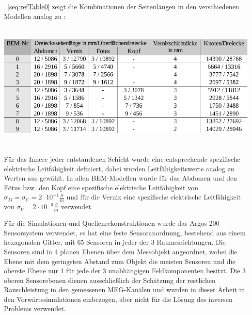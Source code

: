 \tablename~\ref{seq:refTable0} zeigt die Kombinationen der Seitenlängen
in den verschiedenen Modellen analog zu \cite{a1}:



\begin{center}
\begin{minipage}{17cm}
\label{seq:refTable0}
\includegraphics[width=16.018cm,height=6.412cm]{BA-img/BA-img8.pdf}\end{minipage}
\end{center}
Für das Innere jeder entstandenen Schicht wurde eine entsprechende
spezifische elektrische Leitfähigkeit definiert, dabei wurden
Leitfähigkeitswerte analog zu Werten aus \cite{a3} gewählt. In allen
BEM-Modellen wurde für das Abdomen und den Fötus bzw. den Kopf eine
spezifische elektrische Leitfähigkeit von $\sigma _{M}=\sigma
_{C}=2\cdot 10^{-1}\frac{S}{m}$ und für die Vernix eine spezifische
elektrische Leitfähigkeit von $\sigma _{V}=2\cdot 10^{-6}\frac{S}{m}$
verwendet.

Für die Simulationen und Quellenrekonstruktionen wurde das Argos-200
Sensorsystem verwendet, es hat eine feste Sensoranordnung, bestehend
aus einem hexagonalen Gitter, mit 65 Sensoren in jeder der 3
Raumesrichtungen. Die Sensoren sind in 4 planen Ebenen über dem
Messobjekt angeordnet, wobei die Ebene mit dem geringsten Abstand zum
Objekt die meisten Sensoren und die oberste Ebene nur 1 für jede der 3
unabhängigen Feldkomponenten besitzt. Die 3 oberen Sensorebenen dienen
ausschließlich der Schätzung der restlichen Rauschleistung in den
gemessenen MEG-Kanälen und wurden in dieser Arbeit in den
Vorwärtssimulationen einbezogen, aber nicht für die Lösung des inversen
Problems verwendet.



